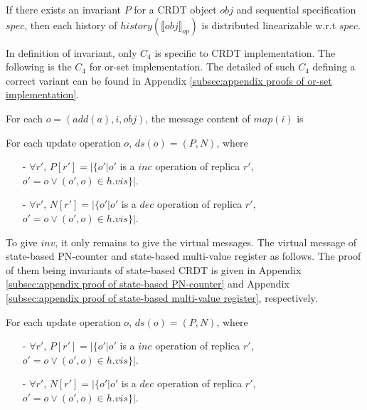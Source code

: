 \begin{lemma}
\label{lemma:invariant of operation-based CRDT implies distributed linearizability}
If there exists an invariant $P$ for a CRDT object $\mathit{obj}$ and sequential specification $\mathit{spec}$, then each history of $\mathit{history}(\llbracket \mathit{obj} \rrbracket_{\mathit{op}})$ is distributed linearizable w.r.t $\mathit{spec}$.
\end{lemma}

In definition of invariant, only $C_4$ is specific to CRDT implementation. The following is the $C_4$ for or-set implementation. The detailed of such $C_4$ defining a correct variant can be found in Appendix \ref{subsec:appendix proofs of or-set implementation}.

\begin{example}
\label{example:c4 for or-set implementation}

For each $o = (\mathit{add}(a),i,\mathit{obj})$, the message content of $\mathit{map}(i)$ is

For each update operation $o$, $\mathit{ds}(o) = (P,N)$, where

\begin{itemize}
\setlength{\itemsep}{0.5pt}
\item[-] $\forall r'$, $P[r'] = \vert \{ o' \vert o'$ is a $\mathit{inc}$ operation of replica $r'$, $o' = o \vee (o',o) \in h.\mathit{vis} \} \vert$.

\item[-] $\forall r'$, $N[r'] = \vert \{ o' \vert o'$ is a $\mathit{dec}$ operation of replica $r'$, $o' = o \vee (o',o) \in h.\mathit{vis} \} \vert$.
\end{itemize}
\end{example}





To give $\mathit{inv}$, it only remains to give the virtual messages. The virtual message of state-based PN-counter and state-based multi-value register as follows. The proof of them being invariants of state-based CRDT is given in Appendix \ref{subsec:appendix proof of state-based PN-counter} and Appendix \ref{subsec:appendix proof of state-based multi-value register}, respectively.

\begin{example}
\label{example:virtual messagess of state-based PN-counter}

For each update operation $o$, $\mathit{ds}(o) = (P,N)$, where

\begin{itemize}
\setlength{\itemsep}{0.5pt}
\item[-] $\forall r'$, $P[r'] = \vert \{ o' \vert o'$ is a $\mathit{inc}$ operation of replica $r'$, $o' = o \vee (o',o) \in h.\mathit{vis} \} \vert$.

\item[-] $\forall r'$, $N[r'] = \vert \{ o' \vert o'$ is a $\mathit{dec}$ operation of replica $r'$, $o' = o \vee (o',o) \in h.\mathit{vis} \} \vert$.
\end{itemize}
\end{example}


